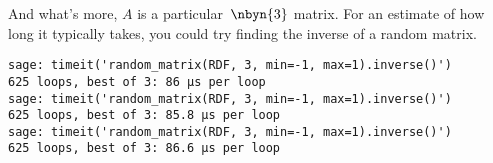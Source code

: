 And what's more, $A$ is a particular~$\nbyn{3}$ matrix. 
For an estimate of
how long it typically takes,
you could try finding the inverse of a random matrix.
\begin{lstlisting}
sage: timeit('random_matrix(RDF, 3, min=-1, max=1).inverse()')
625 loops, best of 3: 86 μs per loop
sage: timeit('random_matrix(RDF, 3, min=-1, max=1).inverse()')
625 loops, best of 3: 85.8 μs per loop
sage: timeit('random_matrix(RDF, 3, min=-1, max=1).inverse()')
625 loops, best of 3: 86.6 μs per loop
\end{lstlisting}


